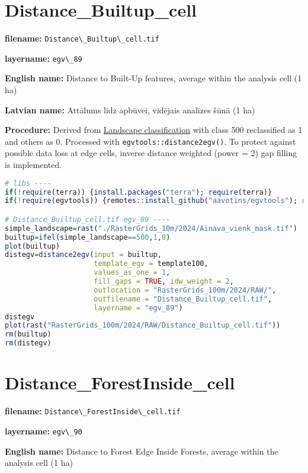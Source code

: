 \documentclass[
]{book}
\newcommand{\passthrough}[1]{#1}
\begin{document}
\section{Distance\_Builtup\_cell}\label{ch06.089}

\textbf{filename:} \passthrough{\lstinline!Distance\_Builtup\_cell.tif!}

\textbf{layername:} \passthrough{\lstinline!egv\_89!}

\textbf{English name:} Distance to Built-Up features, average within the analysis cell (1 ha)

\textbf{Latvian name:} Attālums līdz apbūvei, vidējais analīzes šūnā (1 ha)

\textbf{Procedure:} Derived from \hyperref[Ch05.03]{Landscape classification} with class 500
reclassified as 1 and others as 0. Processed with \passthrough{\lstinline!egvtools::distance2egv()!}.
To protect against possible data loss at edge cells, inverse distance
weighted (power = 2) gap filling is implemented.

\begin{lstlisting}[language=R]
# libs ----
if(!require(terra)) {install.packages("terra"); require(terra)}
if(!require(egvtools)) {remotes::install_github("aavotins/egvtools"); require(egvtools)}

# Distance_Builtup_cell.tif egv_89 ----
simple_landscape=rast("./RasterGrids_10m/2024/Ainava_vienk_mask.tif")
builtup=ifel(simple_landscape==500,1,0)
plot(builtup)
distegv=distance2egv(input = builtup,
                     template_egv = template100,
                     values_as_one = 1,
                     fill_gaps = TRUE, idw_weight = 2,
                     outlocation = "RasterGrids_100m/2024/RAW/",
                     outfilename = "Distance_Builtup_cell.tif",
                     layername = "egv_89")
distegv
plot(rast("RasterGrids_100m/2024/RAW/Distance_Builtup_cell.tif"))
rm(builtup)
rm(distegv)
\end{lstlisting}

\section{Distance\_ForestInside\_cell}\label{ch06.090}

\textbf{filename:} \passthrough{\lstinline!Distance\_ForestInside\_cell.tif!}

\textbf{layername:} \passthrough{\lstinline!egv\_90!}

\textbf{English name:} Distance to Forest Edge Inside Forests, average within the analysis cell (1 ha)
\end{document}
